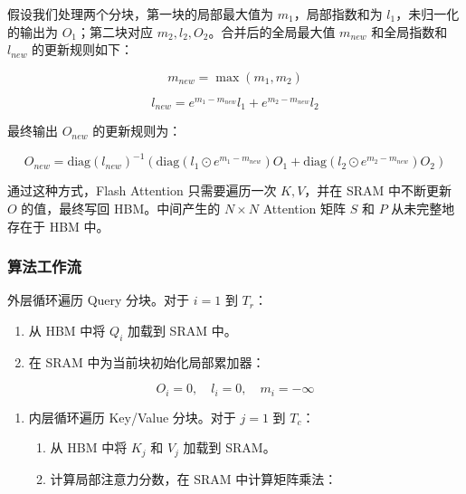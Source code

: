 假设我们处理两个分块，第一块的局部最大值为 \(m_1\)，局部指数和为 \(l_1\)，未归一化的输出为 \(O_1\)；第二块对应 \(m_2,l_2,O_2\)。合并后的全局最大值 \(m_{new}\) 和全局指数和 \(l_{new}\) 的更新规则如下：

\[
m_{new} = \max(m_1,m_2)
\]

\[
l_{new} = e^{m_1-m_{new}}l_1 + e^{m_2-m_{new}}l_2
\]

最终输出 \(O_{new}\) 的更新规则为：

\[
O_{new} = \mathrm{diag}(l_{new})^{-1}\left(\mathrm{diag}\left(l_1 \odot e^{m_1-m_{new}}\right)O_1 + \mathrm{diag}\left(l_2 \odot e^{m_2-m_{new}}\right)O_2\right)
\]

通过这种方式，Flash Attention 只需要遍历一次 \(K,V\)，并在 SRAM 中不断更新 \(O\) 的值，最终写回 HBM。中间产生的 \(N \times N\) Attention 矩阵 \(S\) 和 \(P\) 从未完整地存在于 HBM 中。

\hypertarget{ux7b97ux6cd5ux5de5ux4f5cux6d41}{%
\subsubsection{算法工作流}\label{ux7b97ux6cd5ux5de5ux4f5cux6d41}}

外层循环遍历 Query 分块。对于 \(i = 1\) 到 \(T_r\)：

\begin{enumerate}
\def\labelenumi{\arabic{enumi}.}
\tightlist
\item
  从 HBM 中将 \(Q_i\) 加载到 SRAM 中。
\item
{}
  在 SRAM 中为当前块初始化局部累加器：
\end{enumerate}

\[
O_i = 0,\quad l_i = 0,\quad m_i = -\infty
\]

\begin{enumerate}
\def\labelenumi{\arabic{enumi}.}
\setcounter{enumi}{2}
\item
{}
  内层循环遍历 Key/Value 分块。对于 \(j = 1\) 到 \(T_c\)：

  \begin{enumerate}
  \def\labelenumii{\arabic{enumii}.}
  \tightlist
  \item
    从 HBM 中将 \(K_j\) 和 \(V_j\) 加载到 SRAM。
  \item
{}
    计算局部注意力分数，在 SRAM 中计算矩阵乘法：
  \end{enumerate}
\end{enumerate}

